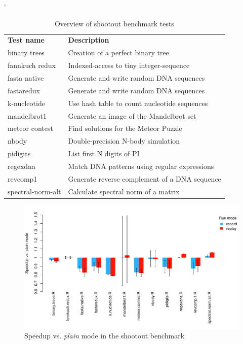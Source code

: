 \documentclass[thesis=M,english,hidelinks]{FITthesis}[2012/10/20]
\begin{document}
		\begin{table}[ht]
			\catcode`
			\centering
			\setlength\extrarowheight{1mm}
			\renewcommand{\tabcolsep}{3pt}
			\begin{tabularx}{\textwidth}{lX}
				\bfseries Test name & \bfseries Description\\
				binary trees & Creation of a perfect binary tree\\
				fannkuch redux & Indexed-access to tiny integer-sequence\\
				fasta native & Generate and write random DNA sequences\\
				fastaredux & Generate and write random DNA sequences\\
				k-nucleotide & Use hash table to count nucleotide sequences\\
				mandelbrot1 & Generate an image of the Mandelbrot set\\
				meteor contest & Find solutions for the Meteor Puzzle\\
				nbody & Double-precision N-body simulation\\
				pidigits & List first N digits of PI\\
				regexdna & Match DNA patterns using regular expressions\\
				revcomp1 & Generate reverse complement of a DNA sequence\\
				spectral-norm-alt & Calculate spectral norm of a matrix\\
			\end{tabularx}
			\caption{Overview of shootout benchmark tests}
		\end{table}
		
		\begin{figure}[ht]\centering
			\includegraphics[width=1.0\textwidth]{benchmarks/shootout/plot_difference}
			\caption{Speedup vs. \emph{plain} mode in the shootout benchmark}\label{fig:shootout_difference}
		\end{figure}
		
\end{document}
